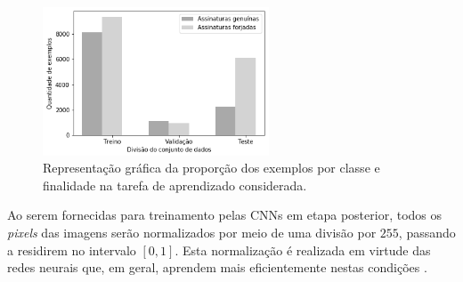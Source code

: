 \begin{figure}[h!]
\centering
\caption{Representação gráfica da proporção dos exemplos por classe e finalidade na tarefa de aprendizado considerada.}
\label{fig:divisao-dados}
\includegraphics[width=0.6\textwidth]{imgs/divisao-dados}
\end{figure}

Ao serem fornecidas para treinamento pelas CNNs em etapa posterior, todos os \emph{pixels} das imagens serão normalizados por meio de uma divisão por $255$, passando a residirem no intervalo $[0,1]$. Esta normalização é realizada em virtude das redes neurais que, em geral, aprendem mais eficientemente nestas condições \cite{chollet}.
